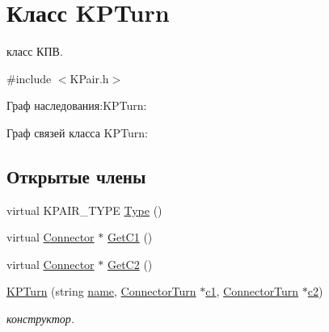 \hypertarget{class_k_p_turn}{
\section{Класс KPTurn}
\label{class_k_p_turn}
}


класс КПВ.  




{\ttfamily \#include $<$KPair.h$>$}



Граф наследования:KPTurn:


Граф связей класса KPTurn:
\subsection*{Открытые члены}
\begin{DoxyCompactItemize}
\item 
virtual KPAIR\_\-TYPE \hyperlink{class_k_p_turn_a7997ae3d88f2c69a07d3982c152bc9f7}{Type} ()
\item 
virtual \hyperlink{struct_connector}{Connector} $\ast$ \hyperlink{class_k_p_turn_a29f17c7b82b94d9be16cc7d5f6e2225c}{GetC1} ()
\item 
virtual \hyperlink{struct_connector}{Connector} $\ast$ \hyperlink{class_k_p_turn_a306624183bfa0c1005954dab38ad4f52}{GetC2} ()
\item 
\hyperlink{class_k_p_turn_a5dc249e151604566735122bfa68ae484}{KPTurn} (string \hyperlink{class_k_pair_ae2868cc85dce1139586a5a60eab22400}{name}, \hyperlink{struct_connector_turn}{ConnectorTurn} $\ast$\hyperlink{class_k_p_turn_ac0745319579d2359363ca7ae6f57ce7e}{c1}, \hyperlink{struct_connector_turn}{ConnectorTurn} $\ast$\hyperlink{class_k_p_turn_a02241f465d7bca987edbd8cfa780faf7}{c2})
\begin{DoxyCompactList}\small\item\em конструктор. \item\end{DoxyCompactList}\end{DoxyCompactItemize}
